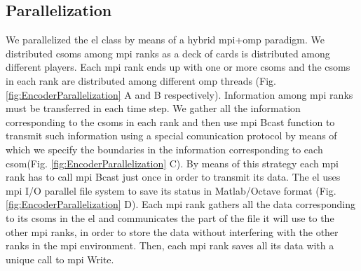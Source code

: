 \documentclass{book}
\begin{document}
\begin{appendices}
\section{ Parallelization}

We parallelized the \gls{el} class by means of a hybrid \gls{mpi}+\gls{omp} paradigm. We distributed \glspl{csom} among \gls{mpi} ranks as a deck of cards is distributed among different players. Each \gls{mpi} rank ends up with one or more \glspl{csom} and the \glspl{csom} in each rank are distributed among different \gls{omp} threads (Fig. \ref{fig:EncoderParallelization} A and B respectively). Information among \gls{mpi} ranks must be transferred in each time step. We gather all the information corresponding to the \glspl{csom} in each rank and then use \gls{mpi} Bcast function to transmit such information using a special comunication protocol by means of which we specify the boundaries in the information corresponding to each \gls{csom}(Fig. \ref{fig:EncoderParallelization} C). By means of this strategy each \gls{mpi} rank has to call \gls{mpi} Bcast just once in order to transmit its data. The \gls{el} uses \gls{mpi} I/O parallel file system to save its status in Matlab/Octave format (Fig. \ref{fig:EncoderParallelization} D). Each \gls{mpi} rank gathers all the data corresponding to its \glspl{csom} in the \gls{el} and communicates the part of the file it will use to the other \gls{mpi} ranks, in order to store the data without interfering with the other ranks in the \gls{mpi} environment. Then, each \gls{mpi} rank saves all its data with a unique call to \gls{mpi} Write. 


\end{appendices}
\end{document}

